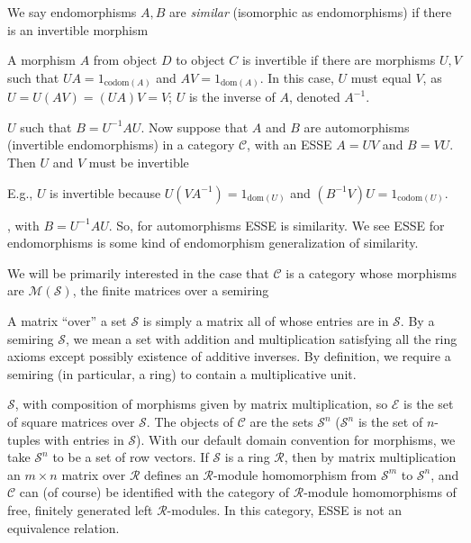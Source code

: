 \documentclass{amsart}
\newcommand{\si}{\index}
\theoremstyle{definition}
\theoremstyle{definition}
\newcommand{\Z}{\mathbb Z}
\newcommand{\R}{\mathbb R}
\numberwithin{equation}{subsection}
\begin{document}
     We say endomorphisms $A,B$ are
     {\it similar}\si{similarity of morphisms} (isomorphic as endomorphisms)
    if there is an invertible morphism\begin{footnote}{A morphism $A$
      from object $D$ to object $C$ is
      invertible if there are morphisms $U,V$ such that
      $UA= 1_{\text{codom}(A)}$
      and $AV=1_{\text{dom}(A)}$. In this case, $U$ must equal $V$, as
      $U=U(AV)=(UA)V=V$; $U$ is the inverse of $A$, denoted
      $A^{-1}$.}\end{footnote}
    $U$ such that
     $B=U^{-1}AU$.
Now suppose  that $A$ and $B$ are automorphisms
   (invertible endomorphisms) in a category $\mathcal C$,
   with an ESSE $A=UV$ and $B=VU$. Then
   $U$ and $V$ must be
   invertible\begin{footnote}{E.g.,
     $U$ is invertible because $U(VA^{-1})=1_{\text{dom}(U)}$ and
     $(B^{-1}V)U=1_{\text{codom}(U)}$.}\end{footnote},
     with
   $B=U^{-1}AU$. So,  for automorphisms ESSE is similarity.
   We see ESSE for endomorphisms is some kind of endomorphism generalization
   of similarity.


   We will be primarily interested in the case that
   $\mathcal C$ is a category whose morphisms are
   $\mathcal M(\mathcal S)$, the finite matrices over
   a semiring\begin{footnote}{A matrix ``over'' a set $\mathcal S$ is simply a
   matrix all of whose entries are in $\mathcal S$.
By a semiring\si{semiring} $\mathcal S$, we mean a set with addition
   and multiplication satisfying all the ring axioms except possibly
   existence of additive inverses.
   By definition, we require a semiring (in particular, a ring)
   to contain a multiplicative unit.}\end{footnote}
 $\mathcal S $,
   with composition of morphisms given by matrix multiplication,
   so $\mathcal E$ is the set of square matrices  over $\mathcal S$.
   The objects of $\mathcal C$ are the sets $\mathcal S^n$ ($\mathcal S^n$
   is the set of   $n$-tuples with entries in $\mathcal S$).
 With our default domain convention
 for morphisms, we take $\mathcal S^n$ to be a set of row vectors.
 If $\mathcal S$ is a ring $\mathcal R$, then
 by matrix multiplication
 an $m\times n$ matrix over $\mathcal R$ defines
    an $\mathcal R$-module homomorphism from
    $\mathcal S^m$ to $\mathcal S^n$,
 and  $\mathcal C$ can (of course) be identified with
    the category of $\mathcal R$-module homomorphisms of
    free, finitely generated left $\mathcal R$-modules.
    In this category, ESSE is not an equivalence relation.
\end{document}
